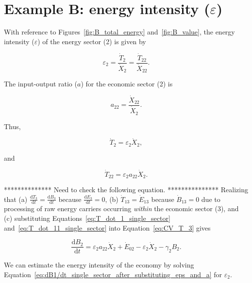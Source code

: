 \section{Example B: energy intensity ($\varepsilon$)}

With reference to Figures~\ref{fig:B_total_energy} and~\ref{fig:B_value}, 
the energy intensity ($\varepsilon$) 
of the energy sector (2) is given by

\begin{equation} \label{eq:single_sector_energy_intensity}
	\varepsilon_{2} = \frac{\dot{T}_{2}}{\dot{X}_{2}} = \frac{\dot{T}_{22}}{\dot{X}_{22}}.
\end{equation}

The input-output ratio ($a$) for the economic sector (2) is

\begin{equation} \label{eq:io_ratio_single_sector}
	a_{22} = \frac{\dot{X}_{22}}{\dot{X}_{2}}.
\end{equation}

\noindent Thus,

\begin{equation} \label{eq:T_dot_1_single_sector}
	\dot{T}_{2} = \varepsilon_{2}\dot{X}_{2},
\end{equation}

\noindent and

\begin{equation} \label{eq:T_dot_11_single_sector}
	\dot{T}_{22} = \varepsilon_{2}a_{22}\dot{X}_{2}.
\end{equation}

************** Need to check the following equation. ***************
Realizing that 
(a) $\frac{\mathrm{d}T_3}{\mathrm{d}t} = \frac{\mathrm{d}B_3}{\mathrm{d}t}$ 
because $\frac{\mathrm{d}E_3}{\mathrm{d}t} = 0$, 
(b) $\dot{T}_{13} = \dot{E}_{13}$ because $\dot{B}_{13} = 0$ 
due to processing of raw energy carriers occurring \emph{within} the economic sector (3), and
(c) substituting Equations~\ref{eq:T_dot_1_single_sector} 
and~\ref{eq:T_dot_11_single_sector} into Equation~\ref{eq:CV_T_3} gives

\begin{equation} \label{eq:dB1/dt_single_sector_after_substituting_eps_and_a}
	\frac{\mathrm{d}B_{2}}{\mathrm{d}t} = \varepsilon_{2}a_{22}\dot{X}_{2} + \dot{E}_{02} - \varepsilon_{2}\dot{X}_{2} - \gamma_{2}B_{2}.
\end{equation}

We can estimate the energy intensity of the economy by solving 
Equation~\ref{eq:dB1/dt_single_sector_after_substituting_eps_and_a} 
for $\varepsilon_{2}$.

